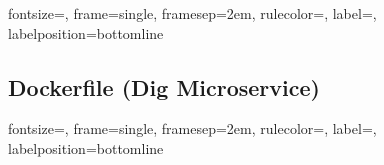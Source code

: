 {fontsize=\footnotesize,
    frame=single,
    framesep=2em,
    rulecolor=\color{Blue},
    label=,
    labelposition=bottomline
}


\subsection{Dockerfile (Dig Microservice)}\label{subsec:dockerfile-(dig-microservice)}

{fontsize=\footnotesize,
    frame=single,
    framesep=2em,
    rulecolor=\color{Blue},
    label=,
    labelposition=bottomline
}

